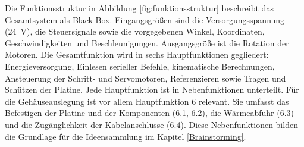 \documentclass[../main.tex]{subfiles}
\begin{document}
Die Funktionsstruktur in Abbildung \ref{fig:funktionsstruktur} beschreibt das Gesamtsystem als Black Box. Eingangsgrößen sind die Versorgungsspannung (24~V), die Steuersignale sowie die vorgegebenen Winkel, Koordinaten, Geschwindigkeiten und Beschleunigungen. Ausgangsgröße ist die Rotation der Motoren. Die Gesamtfunktion wird in sechs Hauptfunktionen gegliedert: Energieversorgung, Einlesen serieller Befehle, kinematische Berechnungen, Ansteuerung der Schritt- und Servomotoren, Referenzieren sowie Tragen und Schützen der Platine. Jede Hauptfunktion ist in Nebenfunktionen unterteilt. Für die Gehäuseauslegung ist vor allem Hauptfunktion 6 relevant. Sie umfasst das Befestigen der Platine und der Komponenten (6.1, 6.2), die Wärmeabfuhr (6.3) und die Zugänglichkeit der Kabelanschlüsse (6.4). Diese Nebenfunktionen bilden die Grundlage für die Ideensammlung im Kapitel \ref{Brainstorming}.

\usetikzlibrary{arrows.meta,calc,positioning}

\end{document}
